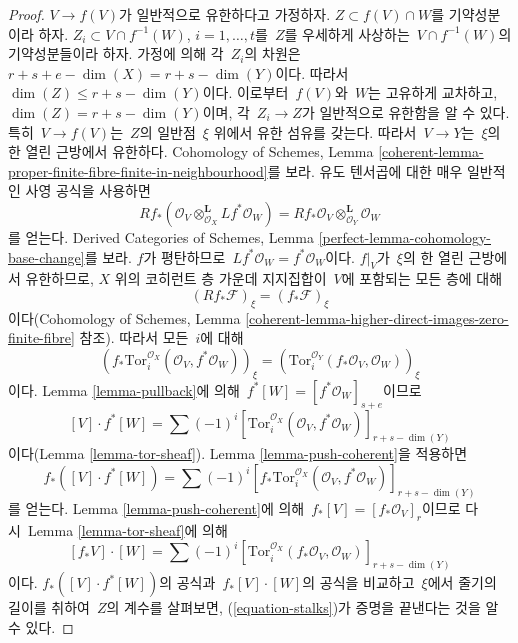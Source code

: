 \begin{proof}
\medskip\noindent
$V \to f(V)$가 일반적으로 유한하다고 가정하자.
$Z \subset f(V) \cap W$를 기약성분이라 하자.
$Z_i \subset V \cap f^{-1}(W)$, $i = 1, \ldots, t$를\  $Z$를 우세하게
사상하는\  $V \cap f^{-1}(W)$의 기약성분들이라 하자. 가정에 의해 각\ 
$Z_i$의 차원은\  $r + s + e - \dim(X) = r + s - \dim(Y)$이다.
따라서\  $\dim(Z) \leq r + s - \dim(Y)$이다. 이로부터\  $f(V)$와\  $W$는
고유하게 교차하고, $\dim(Z) = r + s - \dim(Y)$이며, 각\ 
$Z_i \to Z$가 일반적으로 유한함을 알 수 있다.
특히\  $V \to f(V)$는\  $Z$의 일반점\  $\xi$ 위에서 유한 섬유를 갖는다.
따라서\  $V \to Y$는\  $\xi$의 한 열린 근방에서 유한하다.
Cohomology of Schemes, Lemma
\ref{coherent-lemma-proper-finite-fibre-finite-in-neighbourhood}를 보라.
유도 텐서곱에 대한 매우 일반적인 사영 공식을 사용하면
$$
Rf_*(\mathcal{O}_V \otimes_{\mathcal{O}_X}^\mathbf{L} Lf^*\mathcal{O}_W) =
Rf_*\mathcal{O}_V \otimes_{\mathcal{O}_Y}^\mathbf{L} \mathcal{O}_W
$$
를 얻는다. Derived Categories of Schemes, Lemma
\ref{perfect-lemma-cohomology-base-change}를 보라.
$f$가 평탄하므로\  $Lf^*\mathcal{O}_W = f^*\mathcal{O}_W$이다.
$f|_V$가\  $\xi$의 한 열린 근방에서 유한하므로, $X$ 위의 코히런트 층 가운데
지지집합이\  $V$에 포함되는 모든 층에 대해
$$
(Rf_*\mathcal{F})_\xi = (f_*\mathcal{F})_\xi
$$
이다(Cohomology of Schemes, Lemma
\ref{coherent-lemma-higher-direct-images-zero-finite-fibre} 참조).
따라서 모든\  $i$에 대해
\begin{equation}
\label{equation-stalks}
\left(
f_*\text{Tor}_i^{\mathcal{O}_X}(\mathcal{O}_V, f^*\mathcal{O}_W)
\right)_\xi =
\left(\text{Tor}_i^{\mathcal{O}_Y}(f_*\mathcal{O}_V, \mathcal{O}_W)\right)_\xi
\end{equation}
이다. Lemma \ref{lemma-pullback}에 의해\ 
$f^*[W] = [f^*\mathcal{O}_W]_{s + e}$이므로
$$
[V] \cdot f^*[W] =
\sum (-1)^i
[\text{Tor}_i^{\mathcal{O}_X}(\mathcal{O}_V,
f^*\mathcal{O}_W)]_{r + s - \dim(Y)}
$$
이다(Lemma \ref{lemma-tor-sheaf}). Lemma \ref{lemma-push-coherent}을 적용하면
$$
f_*([V] \cdot f^*[W]) =
\sum (-1)^i
[f_*\text{Tor}_i^{\mathcal{O}_X}(\mathcal{O}_V,
f^*\mathcal{O}_W)]_{r + s - \dim(Y)}
$$
를 얻는다. Lemma \ref{lemma-push-coherent}에 의해\ 
$f_*[V] = [f_*\mathcal{O}_V]_r$이므로 다시\  Lemma \ref{lemma-tor-sheaf}에 의해
$$
[f_*V] \cdot [W] =
\sum (-1)^i
[\text{Tor}_i^{\mathcal{O}_X}(f_*\mathcal{O}_V,
\mathcal{O}_W)]_{r + s - \dim(Y)}
$$
이다. $f_*([V] \cdot f^*[W])$의 공식과\  $f_*[V] \cdot [W]$의 공식을
비교하고\  $\xi$에서 줄기의 길이를 취하여\  $Z$의 계수를 살펴보면,
(\ref{equation-stalks})가 증명을 끝낸다는 것을 알 수 있다.
\end{proof}

